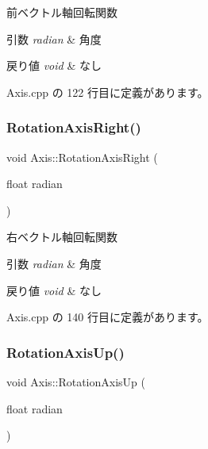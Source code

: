 前ベクトル軸回転関数 


\begin{DoxyParams}{引数}
{\em radian} & 角度 \\
\hline
\end{DoxyParams}

\begin{DoxyRetVals}{戻り値}
{\em void} & なし \\
\hline
\end{DoxyRetVals}


 Axis.\+cpp の 122 行目に定義があります。

\mbox{\label{class_axis_aeb54b8fe54afaa79c930c64136f0007d}} 
\subsubsection{\texorpdfstring{Rotation\+Axis\+Right()}{RotationAxisRight()}}
{\footnotesize\ttfamily void Axis\+::\+Rotation\+Axis\+Right (\begin{DoxyParamCaption}\item[{float}]{radian }\end{DoxyParamCaption})}



右ベクトル軸回転関数 


\begin{DoxyParams}{引数}
{\em radian} & 角度 \\
\hline
\end{DoxyParams}

\begin{DoxyRetVals}{戻り値}
{\em void} & なし \\
\hline
\end{DoxyRetVals}


 Axis.\+cpp の 140 行目に定義があります。

\mbox{\label{class_axis_a90411a040bb9673b5e0785a4da46c023}} 
\subsubsection{\texorpdfstring{Rotation\+Axis\+Up()}{RotationAxisUp()}}
{\footnotesize\ttfamily void Axis\+::\+Rotation\+Axis\+Up (\begin{DoxyParamCaption}\item[{float}]{radian }\end{DoxyParamCaption})}



